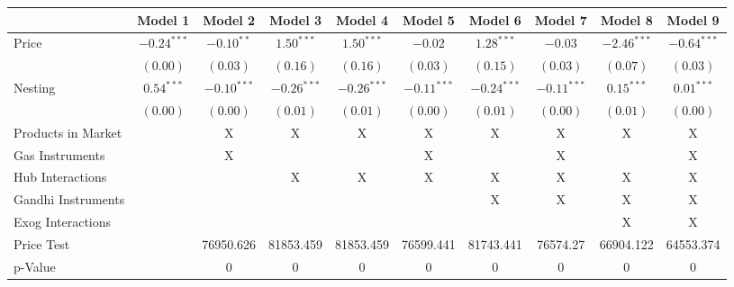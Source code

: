 
\begin{tabular}{l c c c c c c c c c}
\toprule
 & Model 1 & Model 2 & Model 3 & Model 4 & Model 5 & Model 6 & Model 7 & Model 8 & Model 9 \\
\midrule
Price                       & $-0.24^{***}$ & $-0.10^{**}$  & $1.50^{***}$  & $1.50^{***}$  & $-0.02$       & $1.28^{***}$  & $-0.03$       & $-2.46^{***}$ & $-0.64^{***}$ \\
                            & $(0.00)$      & $(0.03)$      & $(0.16)$      & $(0.16)$      & $(0.03)$      & $(0.15)$      & $(0.03)$      & $(0.07)$      & $(0.03)$      \\
Nesting                     & $0.54^{***}$  & $-0.10^{***}$ & $-0.26^{***}$ & $-0.26^{***}$ & $-0.11^{***}$ & $-0.24^{***}$ & $-0.11^{***}$ & $0.15^{***}$  & $0.01^{***}$  \\
                            & $(0.00)$      & $(0.00)$      & $(0.01)$      & $(0.01)$      & $(0.00)$      & $(0.01)$      & $(0.00)$      & $(0.01)$      & $(0.00)$      \\
\midrule
Products in Market          &               & X             & X             & X             & X             & X             & X             & X             & X             \\
Gas Instruments             &               & X             &               &               & X             &               & X             &               & X             \\
Hub Interactions            &               &               & X             & X             & X             & X             & X             & X             & X             \\
Gandhi Instruments          &               &               &               &               &               & X             & X             & X             & X             \\
Exog Interactions           &               &               &               &               &               &               &               & X             & X             \\
Price Test                  &               & 76950.626     & 81853.459     & 81853.459     & 76599.441     & 81743.441     & 76574.27      & 66904.122     & 64553.374     \\
p-Value                     &               & 0             & 0             & 0             & 0             & 0             & 0             & 0             & 0             \\

\end{tabular}
